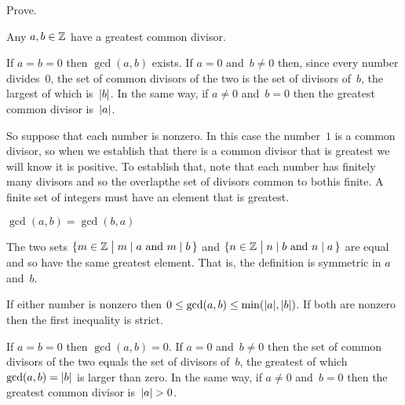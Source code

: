 \documentclass{test}  %
\begin{document}
\begin{problem}
Prove.
\begin{exes} 
\begin{exercise}  
   Any $a,b\in\mathbb{Z}$ have a greatest common divisor.
\end{exercise}
\begin{answer}
  If $a=b=0$ then $\gcd(a,b)$ exists. 
  If $a=0$ and~$b\neq 0$ then, since every number divides~$0$, the set of 
  common divisors of the two is the set of divisors of~$b$, 
  the largest of which is~$\lvert b\rvert$.
  In the same way, if $a\neq 0$ and~$b=0$ then the greatest common divisor 
  is~$\lvert a\rvert$.

  So suppose that each number is nonzero.
  In this case the number~$1$ is a common divisor, so when we establish that 
  there is a common divisor that is greatest we will know it is positive.
  To establish that, note that each number has finitely many divisors and
  so the overlap\Dash the set of divisors common to both\Dash is finite.
  A finite set of integers must have an element that is greatest.  
\end{answer}
\begin{exercise}  
  $\gcd(a,b)=\gcd(b,a)$
\end{exercise}
\begin{answer}
  The two sets 
  $\{m\in\mathbb{Z} \bigm| \text{$m\mid a$ and $m\mid b$\,}\}$
  and 
  $\{n\in\mathbb{Z} \bigm| \text{$n\mid b$ and $n\mid a$\,}\}$
  are equal and so have the same greatest element. 
  That is, the definition is symmetric in $a$ and~$b$.  
\end{answer}
\begin{exercise} 
  If either number is nonzero then 
  $0\leq \gcd(a,b)\leq\min(\lvert a\rvert,\lvert b\rvert)$.
  If both are nonzero then the first
  inequality is strict.
\end{exercise}
\begin{answer}
  If $a=b=0$ then $\gcd(a,b)=0$. 
  If $a=0$ and~$b\neq 0$ then the set of 
  common divisors of the two equals the set of divisors of~$b$, 
  the greatest of which $\gcd(a,b)=\lvert b\rvert$ is larger than zero.
  In the same way, if $a\neq 0$ and~$b=0$ then the greatest common divisor 
  is~$\lvert a\rvert>0$.


\end{answer}
\end{exes}
\end{problem}
\end{document}
